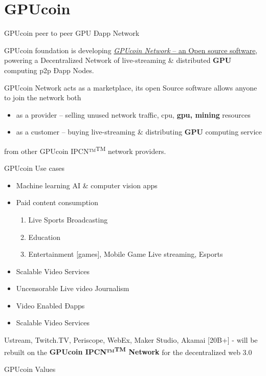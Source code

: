 \documentclass[10pt,handout]{beamer}
\begin{document}
\section{GPUcoin}
\begin{frame}[fragile]{ GPUcoin peer to peer GPU Ðapp Network }

GPUcoin foundation is developing \href{http://gpuco.in/}{\emph{GPUcoin Network} – an Open source software}, powering a Decentralized Network of live-streaming \& distributed \textbf{GPU} computing p2p Ðapp Nodes.
 
\pause
GPUcoin Network acts as a marketplace, its open Source software allows anyone to join the network both 

\begin{itemize}[<+-| alert@+>]
\item as a provider – selling unused network traffic, cpu, \textbf{gpu, mining} resources
\item as a customer – buying live-streaming \& distributing \textbf{GPU} computing service
\end{itemize}
\pause
 from other GPUcoin IPCN™\textsuperscript{TM} network providers. 
\end{frame}



\begin{frame}[fragile]{GPUcoin Use cases}
 \begin{itemize}[<+-| alert@+>]%
\item {Machine learning AI \& computer vision apps} 
\item {Paid content consumption}
\begin{enumerate}[<+-| alert@+>]
\item Live Sports Broadcasting
\item Education 
\item Entertainment [games], Mobile Game Live streaming, Esports
\end{enumerate}
\item {Scalable Video Services}
\item {Uncensorable Live video Journalism}
\item {Video Enabled Ðapps}
\item {Scalable Video Services}

\end{itemize}
\pause

\Large{
Ustream, Twitch.TV, Periscope, WebEx, Maker Studio, Akamai [20B+] - will be rebuilt on the \textbf{GPUcoin IPCN™\textsuperscript{TM} Network} for the decentralized web 3.0
}

\end{frame}
\begin{frame}[t]{GPUcoin Values}

\end{frame}
\end{document}
